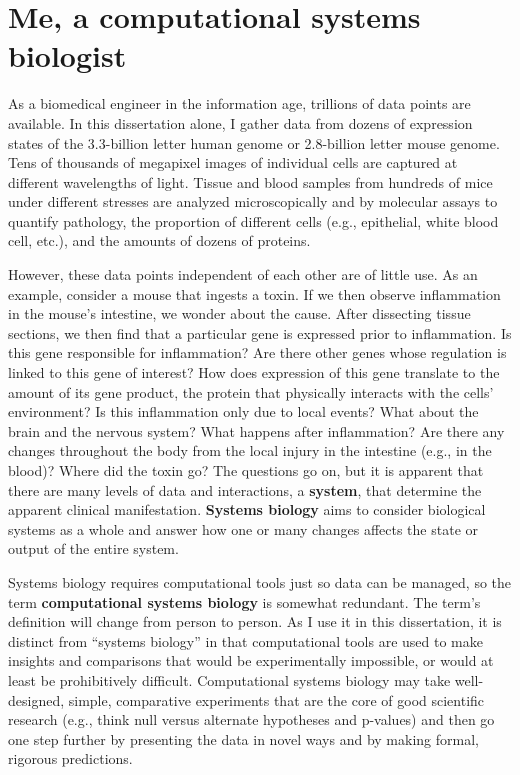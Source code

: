 \section{Me, a computational systems biologist}

As a biomedical engineer in the information age, trillions of 
data points are available. In this dissertation alone, I gather 
data from dozens of expression states of the 3.3-billion 
letter human genome or 2.8-billion letter mouse genome. Tens 
of thousands of megapixel images of individual cells are 
captured at different wavelengths of light. Tissue and blood 
samples from hundreds of mice under different stresses are 
analyzed microscopically and by molecular assays to quantify 
pathology, the proportion of different cells (e.g., epithelial, 
white blood cell, etc.), and the amounts of dozens of proteins. 

However, these data points independent of each other are of little 
use. As an example, consider a mouse that ingests a toxin. If we then observe 
inflammation in the mouse’s intestine, we wonder about the cause.
After dissecting tissue sections, we then find that a particular 
gene is expressed prior to inflammation. Is this gene responsible for 
inflammation? Are there other genes whose regulation is 
linked to this gene of interest? How does expression 
of this gene translate to the amount of its gene product, 
the protein that physically interacts with the cells’ 
environment? Is this inflammation only due to local 
events? What about the brain and the nervous system? What 
happens after inflammation? Are there any changes throughout 
the body from the local injury in the intestine (e.g., in 
the blood)? Where did the toxin go? The questions go on, 
but it is apparent that there are many levels of data and 
interactions, a \textbf{system}, that determine the apparent 
clinical manifestation. \textbf{Systems biology} aims 
to consider biological systems as a whole and answer how 
one or many changes affects the state or output of the 
entire system.

Systems biology requires computational tools just so data 
can be managed, so the term \textbf{computational systems biology} 
is somewhat redundant. The term’s definition will change 
from person to person. As I use it in this dissertation, 
it is distinct from ``systems biology'' in that computational tools 
are used to make insights and comparisons that would be experimentally 
impossible, or would at least be prohibitively difficult.
Computational systems biology may take well-designed, simple, 
comparative experiments that are the core of good scientific 
research (e.g., think null versus 
alternate hypotheses and p-values) and then go one step further
by presenting the data in novel ways and by making formal, rigorous predictions. 


